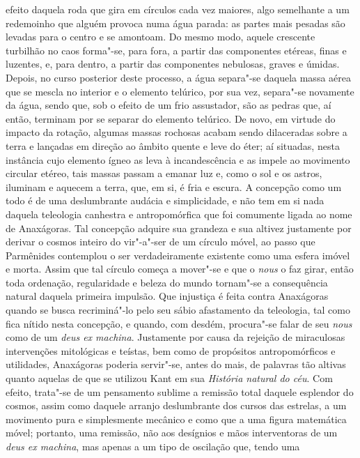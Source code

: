 efeito daquela roda que gira em círculos cada vez maiores, algo semelhante a
um redemoinho que alguém provoca numa água parada: as partes mais pesadas são
levadas para o centro e se amontoam. Do mesmo modo, aquele crescente
turbilhão no caos forma"-se, para fora, a partir das componentes etéreas,
finas e luzentes, e, para dentro, a partir das componentes nebulosas, graves
e úmidas. Depois, no curso posterior deste processo, a água separa"-se
daquela massa aérea que se mescla no interior e o elemento telúrico, por sua
vez, separa"-se novamente da água, sendo que, sob o efeito de um frio
assustador, são as pedras que, aí então, terminam por se separar do elemento
telúrico. De novo, em virtude do impacto da rotação, algumas massas rochosas
acabam sendo dilaceradas sobre a terra e lançadas em direção ao âmbito quente
e leve do éter; aí situadas, nesta instância cujo elemento ígneo as leva à
incandescência e as impele ao movimento circular etéreo, tais massas passam a
emanar luz e, como o sol e os astros, iluminam e aquecem a terra, que, em si,
é fria e escura. A concepção como um todo é de uma deslumbrante audácia e
simplicidade, e não tem em si nada daquela teleologia canhestra e
antropomórfica que foi comumente ligada ao nome de Anaxágoras. Tal concepção
adquire sua grandeza e sua altivez justamente por derivar o cosmos inteiro do
vir"-a"-ser de um círculo móvel, ao passo que Parmênides contemplou o ser
verdadeiramente existente como uma esfera imóvel e morta. Assim que tal
círculo começa a mover"-se e que o \textit{nous} o faz girar, então toda
ordenação, regularidade e beleza do mundo tornam"-se a consequência natural
daquela primeira impulsão. Que injustiça é feita contra Anaxágoras quando se
busca recriminá"-lo pelo seu sábio afastamento da teleologia, tal como fica
nítido nesta concepção, e quando, com desdém, procura"-se falar de
seu \textit{nous} como de um \textit{deus ex machina}. Justamente por 
\label{exmachina} causa da rejeição de miraculosas intervenções mitológicas e
teístas, bem como de propósitos antropomórficos e utilidades, Anaxágoras
poderia servir"-se, antes do mais, de palavras tão altivas quanto aquelas de
que se utilizou Kant em sua \textit{História natural do céu}. Com efeito,
trata"-se de um pensamento sublime a remissão total daquele esplendor do
cosmos, assim como daquele arranjo deslumbrante dos cursos das estrelas, a um
movimento pura e simplesmente mecânico e como que a uma figura matemática
móvel; portanto, uma remissão, não aos desígnios e mãos interventoras de
um \textit{deus ex machina}, mas apenas a um tipo de oscilação que, tendo uma

